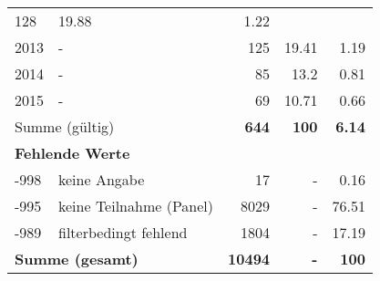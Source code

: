 \begin{longtable}{lXrrr}
       \num{128} &
       \num[round-mode=places,round-precision=2]{19.88} &
         \num[round-mode=places,round-precision=2]{1.22} \\

     2013 &
     \multicolumn{1}{X}{ -  } &


       \num{125} &
       \num[round-mode=places,round-precision=2]{19.41} &
         \num[round-mode=places,round-precision=2]{1.19} \\

     2014 &
     \multicolumn{1}{X}{ -  } &


       \num{85} &
       \num[round-mode=places,round-precision=2]{13.2} &
         \num[round-mode=places,round-precision=2]{0.81} \\

     2015 &
     \multicolumn{1}{X}{ -  } &


       \num{69} &
       \num[round-mode=places,round-precision=2]{10.71} &
         \num[round-mode=places,round-precision=2]{0.66} \\
     \midrule
     \multicolumn{2}{l}{Summe (gültig)} &
       \textbf{\num{644}} &
     \textbf{\num{100}} &
       \textbf{\num[round-mode=places,round-precision=2]{6.14}} \\
     \multicolumn{5}{l}{\textbf{Fehlende Werte}}\\
       -998 &
       keine Angabe &
         \num{17} &
        - &
         \num[round-mode=places,round-precision=2]{0.16} \\
       -995 &
       keine Teilnahme (Panel) &
         \num{8029} &
        - &
         \num[round-mode=places,round-precision=2]{76.51} \\
       -989 &
       filterbedingt fehlend &
         \num{1804} &
        - &
         \num[round-mode=places,round-precision=2]{17.19} \\
     \midrule
     \multicolumn{2}{l}{\textbf{Summe (gesamt)}} &
          \textbf{\num{10494}} &
        \textbf{-} &
        \textbf{\num{100}} \\
     \bottomrule
     \end{longtable}
     
